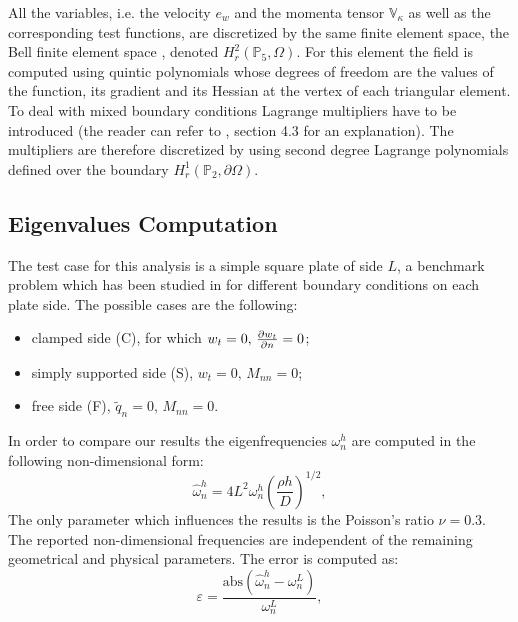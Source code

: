 \documentclass[preprint,12pt]{elsarticle}
\begin{document}
{All the variables, i.e. the velocity $e_w$ and the momenta tensor $\mathbb{V}_\kappa$ as well as the corresponding test functions, are discretized by the same finite element space, the Bell finite element space \cite{Bell}, denoted $H_r^2(\mathbb{P}_5, \Omega)$. For this element the field is computed using quintic polynomials whose degrees of freedom are the values of the function, its gradient and its Hessian at the vertex of each triangular element. To deal with mixed boundary conditions Lagrange multipliers have to be introduced (the reader can refer to \cite{BrugnoliMin}, section 4.3 for an explanation). The multipliers are therefore discretized by using second degree Lagrange polynomials defined over the boundary $H_r^1(\mathbb{P}_2, \partial\Omega)$. 
\subsection{Eigenvalues Computation}
\label{sec:Eigen}
The test case for this analysis is a simple square plate of side $L$, a benchmark problem which has been studied in \cite{LeissaRect, LimEigen} for different boundary conditions on each plate side. The possible cases are the following: 
\begin{itemize}
	\item clamped side (C), for which $w_t = 0, \, \diffp{w_t}{n}=0$; 
	\item simply supported side (S), $w_t = 0, \, M_{nn}=0$;
	\item free side (F), $\widetilde{q}_n = 0, \, M_{nn}=0$.
\end{itemize}
In order to compare our results the eigenfrequencies $\omega_{n}^h$ are computed in the following non-dimensional form:
\begin{equation}
\widehat{\omega}_{n}^h = 4 L^2 \omega_{n}^h \left(\frac{\rho h}{D} \right)^{1/2},
\end{equation}
The only parameter which influences the results is the Poisson's ratio $\nu=0.3$. The reported non-dimensional frequencies are independent of the remaining geometrical and physical parameters.  The error is computed as:
\begin{equation}
\varepsilon = \frac{\text{abs}(\widehat{\omega}_{n}^h - \omega_{n}^{L})}{\omega_{n}^{L}},
\end{equation}
}
\end{document}
